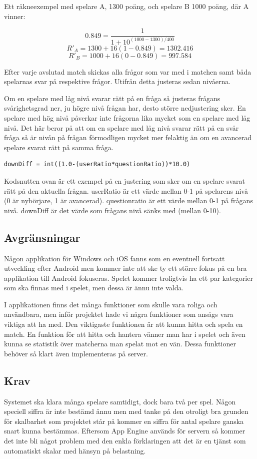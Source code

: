 \documentclass[12pt,a4paper]{article}
\begin{document}
Ett räkneexempel med spelare A, 1300 poäng, och spelare B 1000 poäng, där A vinner:

$$0.849 = \frac{1}{1+10^{(1000-1300)/400}}$$
$$ R'_A = 1300 + 16(1-0.849) = 1302.416 $$
$$ R'_B = 1000 + 16(0-0.849) = 997.584 $$

Efter varje avslutad match skickas alla frågor som var med i matchen samt båda spelarnas svar på respektive frågor. Utifrån detta justeras sedan nivåerna.

Om en spelare med låg nivå svarar rätt på en fråga så justeras frågans svårighetsgrad ner, ju högre nivå frågan har, desto större nedjustering sker. En spelare med hög nivå påverkar inte frågorna lika mycket som en spelare med låg nivå. Det här beror på att om en spelare med låg nivå svarar rätt på en svår fråga så är nivån på frågan förmodligen mycket mer felaktig än om en avancerad spelare svarat rätt på samma fråga. 

\begin{verbatim}
downDiff = int((1.0-(userRatio*questionRatio))*10.0)
\end{verbatim}

Kodsnutten ovan är ett exempel på en justering som sker om en spelare svarat rätt på den aktuella frågan. userRatio är ett värde mellan 0-1 på spelarens nivå (0 är nybörjare, 1 är avancerad). questionratio är ett värde mellan 0-1 på frågans nivå. downDiff är det värde som frågans nivå sänks med (mellan 0-10). 

\subsection{Avgränsningar}
Någon applikation för Windows och iOS fanns som en eventuell fortsatt utveckling efter Android men kommer inte att ske ty ett större fokus på en bra applikation till Android fokuseras. Spelet kommer troligtvis ha ett par kategorier som ska finnas med i spelet, men dessa är ännu inte valda. 

I applikationen finns det många funktioner som skulle vara roliga och användbara, men inför projektet hade vi några funktioner som ansågs vara viktiga att ha med. Den viktigaste funktionen är att kunna hitta och spela en match. En funktion för att hitta och hantera vänner man har i spelet och även kunna se statistik över matcherna man spelat mot en vän. Dessa funktioner behöver så klart även implementeras på server.

\subsection{Krav}
Systemet ska klara många spelare samtidigt, dock bara två per spel. Någon speciell siffra är inte bestämd ännu men med tanke på den otroligt bra grunden för skalbarhet som projektet står på kommer en siffra för antal spelare ganska snart kunna bestämmas. Eftersom App Engine används för servern så kommer det inte bli något problem med den enkla förklaringen att det är en tjänst som automatiskt skalar med hänsyn på belastning. \cite{appenginescalability}
\end{document}
